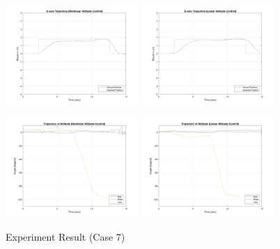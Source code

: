 \begin{figure}
    \includegraphics[width=0.45\textwidth]{graphics/experiment_plots/yaw_minus_non_position_z.png}
    \includegraphics[width=0.45\textwidth]{graphics/experiment_plots/yaw_minus_pid_position_z.png}

    \includegraphics[width=0.45\textwidth]{graphics/experiment_plots/yaw_minus_non_attitude.png}
    \includegraphics[width=0.45\textwidth]{graphics/experiment_plots/yaw_minus_pid_attitude.png}
    \caption{Experiment Result (Case 7)}
    \label{fig:exp_yaw_minus}
\end{figure}


